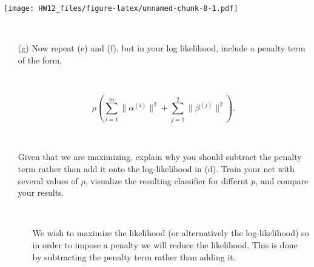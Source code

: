 \documentclass[]{article}
\begin{document}
\texttt{[image: HW12\_files/figure-latex/unnamed-chunk-8-1.pdf]}

~

\newpage

\begin{itemize} \item[(g)] Now repeat (e) and (f), but in your log likelihood, include a penalty term of the form,

\ 


\begin{equation}
\rho \left(\sum_{i=1}^m \|\alpha^{(i)}\|^2 + \sum_{j=1}^2 \|\beta^{(j)}\|^2\right).
\end{equation}

\ 


Given that we are maximizing, explain why you should subtract the penalty term rather than add it onto the log-likelihood in (d).
Train your net with several values of $\rho$, visualize the resulting classifier for differnt $p$, and compare your results.


 \ 
 
 \begin{itemize} \item[] We wish to maximize the likelihood (or alternatively the log-likelihood) so in order to impose a penalty we will reduce the likelihood. This is done by subtracting the penalty term rather than adding it.

 
\end{itemize} 
\end{itemize}

~
\end{document}
